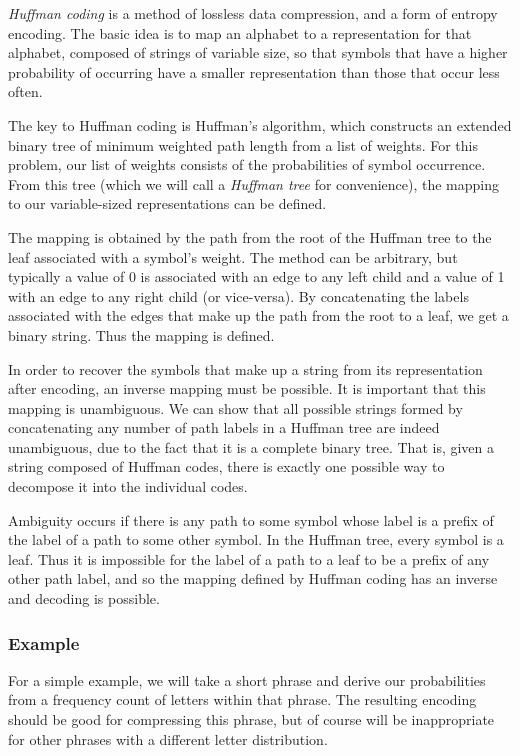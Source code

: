 \documentclass[12pt]{article}
\begin{document}
\emph{Huffman coding} is a method of lossless data compression, and a form of entropy encoding.
The basic idea is to map an alphabet to a representation for that alphabet, composed of strings of variable size, so that symbols that have a higher probability of occurring have a smaller representation than those that occur less often.

The key to Huffman coding is Huffman's algorithm, which constructs an extended binary tree of minimum weighted path length from a list of weights.  For this problem, our list of weights consists of the probabilities of symbol occurrence.  From this tree (which we will call a \emph{Huffman tree} for convenience), the mapping to our variable-sized representations can be defined.

The mapping is obtained by the path from the root of the Huffman tree to the leaf associated with a symbol's weight.  The method can be arbitrary, but typically a value of 0 is associated with an edge to any left child and a value of 1 with an edge to any right child (or vice-versa).  By concatenating the labels associated with the edges that make up the path from the root to a leaf, we get a binary string.  Thus the mapping is defined.

In order to recover the symbols that make up a string from its representation after encoding, an inverse mapping must be possible.
It is important that this mapping is unambiguous.  We can show that all possible strings formed by concatenating any number of path labels in a Huffman tree are indeed unambiguous, due to the fact that it is a complete binary tree.
That is, given a string composed of Huffman codes, there is exactly one possible way to decompose it into the individual codes.

Ambiguity occurs if there is any path to some symbol whose label is a prefix of the label of a path to some other symbol.  In the Huffman tree, every symbol is a leaf.  Thus it is impossible for the label of a path to a leaf to be a prefix of any other path label, and so the mapping defined by Huffman coding has an inverse and decoding is possible.

\subsubsection*{Example}

For a simple example, we will take a short phrase and derive our probabilities from a frequency count of letters within that phrase.  The resulting encoding should be good for compressing this phrase, but of course will be inappropriate for other phrases with a different letter distribution.
\end{document}
